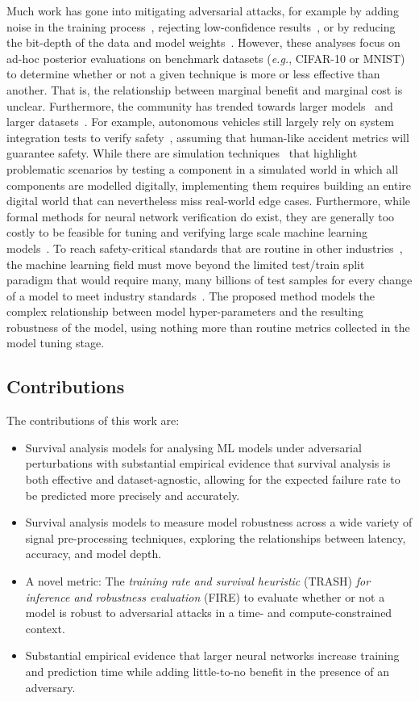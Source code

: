 Much work has gone into mitigating adversarial attacks, for example by adding noise in the training process~\cite{gauss_aug,gauss_out}, rejecting low-confidence results~\cite{high_conf}, or by reducing the bit-depth of the data and model weights~\cite{feature_squeezing}.
However, these analyses focus on ad-hoc posterior evaluations on benchmark datasets (\textit{e.g.}, CIFAR-10 or MNIST) to determine whether or not a given technique is more or less effective than another.
That is, the relationship between marginal benefit and marginal cost is unclear.
Furthermore, the community has trended towards larger models~\cite{desislavov2021compute} and larger datasets~\cite{desislavov2021compute,bailly2022effects}.
For example, autonomous vehicles still largely rely on system integration tests to verify safety~\cite{vehicle_testing_review}, assuming that human-like accident metrics will guarantee safety.
While there are simulation techniques~\cite{vehicle_formal} that highlight problematic scenarios by testing a component in a simulated world in which all components are modelled digitally, implementing them requires building an entire digital world that can nevertheless miss real-world edge cases.
Furthermore, while formal methods for neural network verification do exist, they are generally too costly to be feasible for tuning and verifying large scale machine learning models~\cite{formal_adversarial}.
To reach safety-critical standards that are routine in other industries~\cite{iso26262,IEC61508,IEC62034}, the machine learning field must move beyond the limited test/train split paradigm that would require many, many billions of test samples for every change of a model to meet industry standards~\cite{meyers}.
The proposed method models the complex relationship between model hyper-parameters and the resulting robustness of the model, using nothing more than routine metrics collected in the model tuning stage.

\subsection{Contributions}

The contributions of this work are:
\begin{itemize}
	\item Survival analysis models for analysing ML models under adversarial perturbations with substantial empirical evidence that survival analysis is both effective and dataset-agnostic, allowing for the expected failure rate to be predicted more precisely and accurately.
	\item Survival analysis models to measure model robustness across a wide variety of signal pre-processing techniques, exploring the relationships between latency, accuracy, and model depth.
	\item A novel metric: The \textit{training rate and survival heuristic } (TRASH) \textit{for inference and robustness evaluation} (FIRE) to evaluate whether or not a model is robust to adversarial attacks in a time- and compute-constrained context.
	\item Substantial empirical evidence that larger neural networks increase training and prediction time while adding little-to-no benefit in the presence of an adversary.
\end{itemize}
